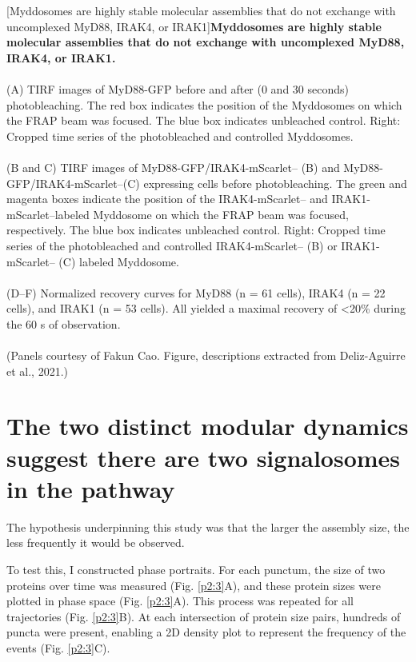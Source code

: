 \begin{centering}
\captionsetup{parbox=none}
[Myddosomes are highly stable molecular assemblies that do not exchange with uncomplexed MyD88, IRAK4, or IRAK1]{\textbf{Myddosomes are highly stable molecular assemblies that do not exchange with uncomplexed MyD88, IRAK4, or IRAK1.}
\\
\\
(A) TIRF images of MyD88-GFP before and after (0 and 30 seconds) photobleaching. The red box indicates the position of the Myddosomes on which the FRAP beam was focused. The blue box indicates unbleached control. Right: Cropped time series of the photobleached and controlled Myddosomes.
\\
\\
(B and C) TIRF images of MyD88-GFP/IRAK4-mScarlet– (B) and MyD88-GFP/IRAK4-mScarlet–(C) expressing cells before photobleaching. The green and magenta boxes indicate the position of the IRAK4-mScarlet– and IRAK1-mScarlet–labeled Myddosome on which the FRAP beam was focused, respectively. The blue box indicates unbleached control. Right: Cropped time series of the photobleached and controlled IRAK4-mScarlet– (B) or IRAK1-mScarlet– (C) labeled Myddosome.
\\
\\
(D–F) Normalized recovery curves for MyD88 (n = 61 cells), IRAK4 (n = 22 cells), and IRAK1 (n = 53 cells). All yielded a maximal recovery of <20\% during the 60 s of observation.
\\
\\
(Panels courtesy of Fakun Cao. Figure, descriptions extracted from Deliz-Aguirre et al., 2021.)}
\label{p1:5}
\end{centering}

\section{The two distinct modular dynamics suggest there are two signalosomes in the pathway}
\label{section:dynamics}
The hypothesis underpinning this study was that the larger the assembly size, the less frequently it would be observed.

To test this, I constructed phase portraits. For each punctum, the size of two proteins over time was measured (Fig. \ref{p2:3}A), and these protein sizes were plotted in phase space (Fig. \ref{p2:3}A). This process was repeated for all trajectories (Fig. \ref{p2:3}B). At each intersection of protein size pairs, hundreds of puncta were present, enabling a 2D density plot to represent the frequency of the events (Fig. \ref{p2:3}C).


